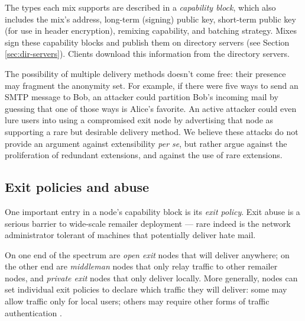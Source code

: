 \documentclass[11pt]{IEEEtran}
\begin{document}
The types each mix supports are described in a \emph{capability block},
which also includes the mix's address, long-term (signing) public key,
short-term public key (for use in header encryption), remixing capability,
and batching strategy. Mixes sign these capability blocks
and publish them on directory servers (see Section \ref{sec:dir-servers}).
Clients download this information from the directory servers.

%

The possibility of multiple delivery methods doesn't come free: their
presence may fragment the anonymity set.  For example, if there were five
ways to send an SMTP message to Bob, an attacker could partition Bob's
incoming mail by guessing that one of those ways is Alice's favorite.
An active attacker could even lure users into using a compromised
exit node by advertising that node as supporting a
rare but desirable delivery method.
We believe these attacks do not provide an argument against
extensibility \emph{per se}, but rather argue against the proliferation
of redundant extensions, and against the use of rare extensions.  

\subsection{Exit policies and abuse}
\label{subsec:exitpolicies}

One important entry in a node's capability block is its \emph{exit
policy}. Exit abuse is a serious barrier to wide-scale remailer deployment
--- rare indeed is the network administrator tolerant of machines that
potentially deliver hate mail. %

On one end of the spectrum are \emph{open exit} nodes that will
deliver anywhere; on the other end are \emph{middleman} nodes that
only relay traffic to other remailer nodes, and \emph{private exit}
nodes that only deliver locally. More generally, nodes can set
individual exit policies to declare which traffic they will deliver:
some may allow traffic only for local users; others may require
other forms of traffic authentication
\cite{onion-discex00}.
\end{document}
